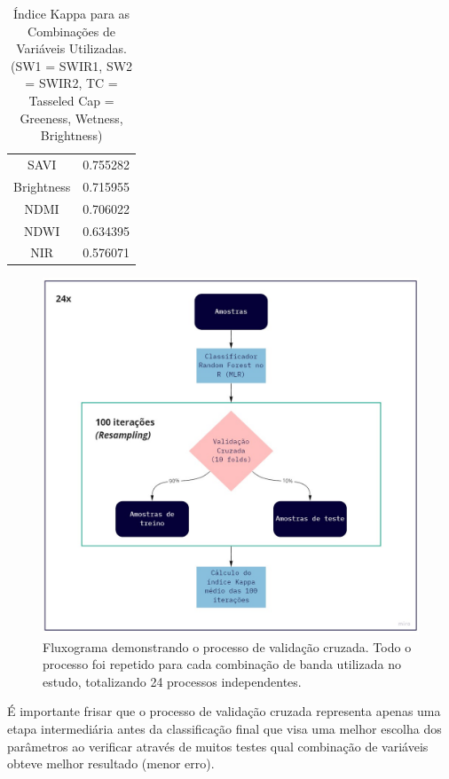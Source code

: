 \documentclass[12pt,a4paper]{article}
\begin{document}
\begin{table}[h!]
\begin{tabular}{|c | c|}
                                                                SAVI &  0.755282 \\
                                                          Brightness &  0.715955 \\
                                                                NDMI &  0.706022 \\
                                                                NDWI &  0.634395 \\
                                                                 NIR &  0.576071 \\
\hline
\end{tabular}
\caption{Índice Kappa para as Combinações de Variáveis Utilizadas. (SW1 = SWIR1, SW2 = SWIR2, TC = Tasseled Cap = Greeness, Wetness, Brightness)}
\label{tab:1}
\end{table}

\newpage

\begin{figure}[h!]
    \centering
    \includegraphics[scale=.4]{images/fluxograma.jpg}
    \caption{Fluxograma demonstrando o processo de validação cruzada. Todo o processo foi repetido para cada combinação de banda utilizada no estudo, totalizando 24 processos independentes.}
    \label{fig:fluxograma}
\end{figure}

É importante frisar que o processo de validação cruzada representa apenas uma etapa intermediária antes da classificação final que visa uma melhor escolha dos parâmetros ao verificar através de muitos testes qual combinação de variáveis obteve melhor resultado (menor erro).
\end{document}
